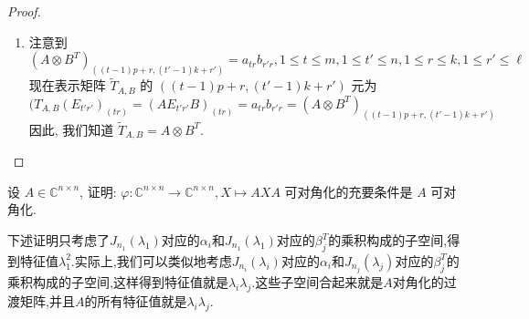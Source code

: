 \documentclass[../../main.tex]{subfiles}
\begin{document}
\begin{proof}
\begin{enumerate}
\item 注意到
$$(A \otimes B^T)_{((t - 1)p + r, (t' - 1)k + r')} = a_{tr} b_{r'r}, 1 \leqslant  t \leqslant  m, 1 \leqslant  t' \leqslant  n, 1 \leqslant  r \leqslant  k, 1 \leqslant  r' \leqslant  \ell$$
现在表示矩阵 $\widetilde{T}_{A,B}$ 的 $((t - 1)p + r, (t' - 1)k + r')$ 元为
$$(T_{A,B}(E_{t'r'})_{(tr)} = (AE_{t'r'}B)_{(tr)} = a_{tr} b_{r'r} = (A \otimes B^T)_{((t - 1)p + r, (t' - 1)k + r')}$$
因此, 我们知道 $\widetilde{T}_{A,B} = A \otimes B^T$.
\end{enumerate}
\end{proof}

\begin{example}
设 $A \in \mathbb{C}^{n \times n}$, 证明: $\varphi : \mathbb{C}^{n \times n} \to \mathbb{C}^{n \times n}, X \mapsto AXA$ 可对角化的充要条件是 $A$ 可对角化.
\end{example}
\begin{note}
下述证明只考虑了$J_{n_1}(\lambda_1)$对应的$\alpha_i$和$J_{n_1}(\lambda_1)$对应的$\beta_j^T$的乘积构成的子空间,得到特征值$\lambda_1^2$.实际上,我们可以类似地考虑$J_{n_i}(\lambda_i)$对应的$\alpha_i$和$J_{n_j}(\lambda_j)$对应的$\beta_j^T$的乘积构成的子空间,这样得到特征值就是$\lambda_i\lambda_j$.这些子空间合起来就是$A$对角化的过渡矩阵,并且$A$的所有特征值就是$\lambda_i\lambda_j$.
\end{note}
\end{document}
